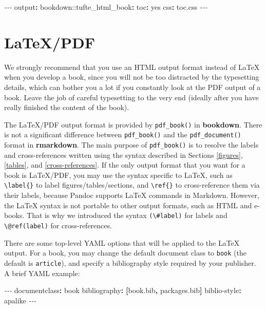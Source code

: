\documentclass[
  12pt,
]{krantz}
\newenvironment{Shaded}{\begin{snugshade}}{\end{snugshade}}
\newcommand{\AttributeTok}[1]{\textcolor[rgb]{0.77,0.63,0.00}{#1}}
\newcommand{\CharTok}[1]{\textcolor[rgb]{0.31,0.60,0.02}{#1}}
\newcommand{\FunctionTok}[1]{\textcolor[rgb]{0.00,0.00,0.00}{#1}}
\newcommand{\KeywordTok}[1]{\textcolor[rgb]{0.13,0.29,0.53}{\textbf{#1}}}
\newcommand{\PreprocessorTok}[1]{\textcolor[rgb]{0.56,0.35,0.01}{\textit{#1}}}
\theoremstyle{definition}
\theoremstyle{definition}
\theoremstyle{definition}
\theoremstyle{definition}
\theoremstyle{remark}
\begin{document}
\begin{Shaded}
\begin{Highlighting}[]
\PreprocessorTok{{-}{-}{-}}
\FunctionTok{output}\KeywordTok{:}
\AttributeTok{  bookdown:}\FunctionTok{:tufte\_html\_book}\KeywordTok{:}
\AttributeTok{    }\FunctionTok{toc}\KeywordTok{:}\AttributeTok{ }\CharTok{yes}
\AttributeTok{    }\FunctionTok{css}\KeywordTok{:}\AttributeTok{ toc.css}
\PreprocessorTok{{-}{-}{-}}
\end{Highlighting}
\end{Shaded}

\hypertarget{latexpdf}{%
\section{LaTeX/PDF}\label{latexpdf}}

We strongly recommend that you use an HTML output format instead of LaTeX when you develop a book, since you will not be too distracted by the typesetting details, which can bother you a lot if you constantly look at the PDF output of a book. Leave the job of careful typesetting to the very end (ideally after you have really finished the content of the book).

The LaTeX/PDF output format is provided by \texttt{pdf\_book()} in \textbf{bookdown}. There is not a significant difference between \texttt{pdf\_book()} and the \texttt{pdf\_document()} format in \textbf{rmarkdown}. The main purpose of \texttt{pdf\_book()} is to resolve the labels and cross-references written using the syntax described in Sections \ref{figures}, \ref{tables}, and \ref{cross-references}. If the only output format that you want for a book is LaTeX/PDF, you may use the syntax specific to LaTeX, such as \texttt{\textbackslash{}label\{\}} to label figures/tables/sections, and \texttt{\textbackslash{}ref\{\}} to cross-reference them via their labels, because Pandoc supports LaTeX commands in Markdown. However, the LaTeX syntax is not portable to other output formats, such as HTML and e-books. That is why we introduced the syntax \texttt{(\textbackslash{}\#label)} for labels and \texttt{\textbackslash{}@ref(label)} for cross-references.

There are some top-level YAML options that will be applied to the LaTeX output. For a book, you may change the default document class to \texttt{book} (the default is \texttt{article}), and specify a bibliography style required by your publisher. A brief YAML example:

\begin{Shaded}
\begin{Highlighting}[]
\PreprocessorTok{{-}{-}{-}}
\FunctionTok{documentclass}\KeywordTok{:}\AttributeTok{ book}
\FunctionTok{bibliography}\KeywordTok{:}\AttributeTok{ }\KeywordTok{[}\AttributeTok{book.bib}\KeywordTok{,}\AttributeTok{ packages.bib}\KeywordTok{]}
\FunctionTok{biblio{-}style}\KeywordTok{:}\AttributeTok{ apalike}
\PreprocessorTok{{-}{-}{-}}
\end{Highlighting}
\end{Shaded}
\end{document}

